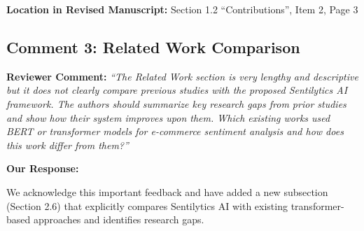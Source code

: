 \documentclass[11pt,a4paper]{article}
\begin{document}
\textbf{Location in Revised Manuscript:} Section 1.2 ``Contributions'', Item 2, Page 3


\subsection*{Comment 3: Related Work Comparison}

\textbf{Reviewer Comment:} \textit{``The Related Work section is very lengthy and descriptive but it does not clearly compare previous studies with the proposed Sentilytics AI framework. The authors should summarize key research gaps from prior studies and show how their system improves upon them. Which existing works used BERT or transformer models for e-commerce sentiment analysis and how does this work differ from them?''}

\vspace{6pt}

\textbf{Our Response:}

We acknowledge this important feedback and have added a new subsection (Section 2.6) that explicitly compares Sentilytics AI with existing transformer-based approaches and identifies research gaps.
\end{document}
